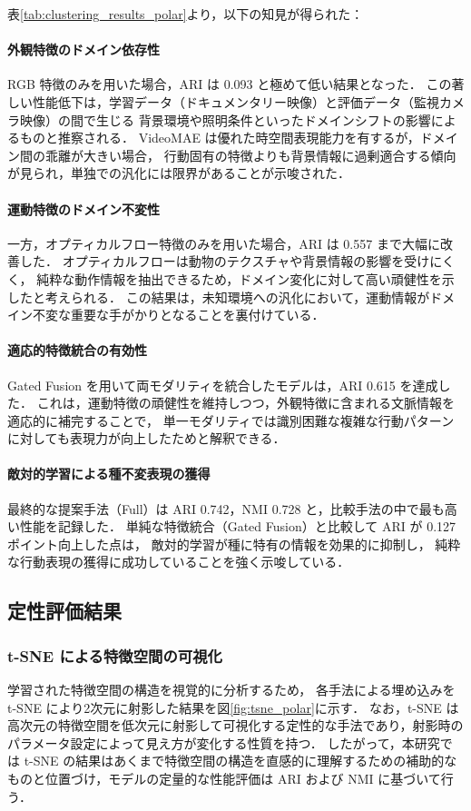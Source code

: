 表\ref{tab:clustering_results_polar}より，以下の知見が得られた：

\paragraph{外観特徴のドメイン依存性}
RGB 特徴のみを用いた場合，ARI は 0.093 と極めて低い結果となった．
この著しい性能低下は，学習データ（ドキュメンタリー映像）と評価データ（監視カメラ映像）の間で生じる
背景環境や照明条件といったドメインシフトの影響によるものと推察される．
VideoMAE は優れた時空間表現能力を有するが，ドメイン間の乖離が大きい場合，
行動固有の特徴よりも背景情報に過剰適合する傾向が見られ，単独での汎化には限界があることが示唆された．

\paragraph{運動特徴のドメイン不変性}
一方，オプティカルフロー特徴のみを用いた場合，ARI は 0.557 まで大幅に改善した．
オプティカルフローは動物のテクスチャや背景情報の影響を受けにくく，
純粋な動作情報を抽出できるため，ドメイン変化に対して高い頑健性を示したと考えられる．
この結果は，未知環境への汎化において，運動情報がドメイン不変な重要な手がかりとなることを裏付けている．

\paragraph{適応的特徴統合の有効性}
Gated Fusion を用いて両モダリティを統合したモデルは，ARI 0.615 を達成した．
これは，運動特徴の頑健性を維持しつつ，外観特徴に含まれる文脈情報を適応的に補完することで，
単一モダリティでは識別困難な複雑な行動パターンに対しても表現力が向上したためと解釈できる．

\paragraph{敵対的学習による種不変表現の獲得}
最終的な提案手法（Full）は ARI 0.742，NMI 0.728 と，比較手法の中で最も高い性能を記録した．
単純な特徴統合（Gated Fusion）と比較して ARI が 0.127 ポイント向上した点は，
敵対的学習が種に特有の情報を効果的に抑制し，
純粋な行動表現の獲得に成功していることを強く示唆している．

\subsection{定性評価結果}

\subsubsection{t-SNE による特徴空間の可視化}
学習された特徴空間の構造を視覚的に分析するため，
各手法による埋め込みを t-SNE により2次元に射影した結果を図\ref{fig:tsne_polar}に示す．
なお，t-SNE は高次元の特徴空間を低次元に射影して可視化する定性的な手法であり，射影時のパラメータ設定によって見え方が変化する性質を持つ．
したがって，本研究では t-SNE の結果はあくまで特徴空間の構造を直感的に理解するための補助的なものと位置づけ，モデルの定量的な性能評価は ARI および NMI に基づいて行う．

